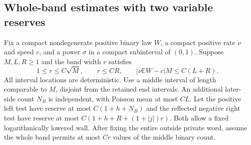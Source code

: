 \subsection{Whole-band estimates with two variable reserves}
\label{updetail:whole-band}
Fix a compact nondegenerate positive binary law $W$, a compact positive
rate $\nu$ and speed $c$, and a power $\sigma$ in a compact subinterval
of $(0,1)$. Suppose $M,L,R\geq1$ and the band width $r$ satisfies
\begin{equation}
 1\leq r\leq C\sqrt M,\qquad r\leq CR,\qquad
 |\nu\mathbb EW-c|M\leq C(L+R).
 \label{updetail:band-assumptions}
\end{equation}
All interval locations are deterministic. Use a middle interval of
length comparable to $M$, disjoint from the retained end intervals.
An additional later-side count $N_B$ is independent, with Poisson mean
at most $CL$. Let the positive left test have reserve at most
$C(1+h+N_B)$ and the reflected negative right test have reserve at most
$C(1+h+R+(1+|j|)r)$. Both allow a fixed logarithmically lowered wall.
After fixing the entire outside private word, assume the whole band
permits at most $Cr$ values of the middle binary count.


